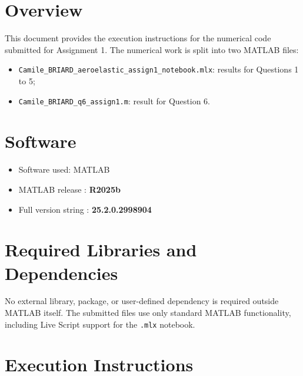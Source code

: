 \renewcommand{\parttitle}{Numerical Code}
\setlength{\parskip}{0pt}

\section*{Overview}
This document provides the execution instructions for the numerical code submitted for Assignment 1.
The numerical work is split into two MATLAB files:
\begin{itemize}\itemsep=0pt\parsep=0pt
\item \texttt{Camile\_BRIARD\_aeroelastic\_assign1\_notebook.mlx}: results for Questions 1 to 5;
\item \texttt{Camile\_BRIARD\_q6\_assign1.m}: result for Question 6.
\end{itemize}
\vspace{2em}
\noindent
\begin{minipage}[t]{0.30\textwidth}
\section*{Software}
\begin{itemize}\itemsep=0pt\parsep=0pt
\item Software used: MATLAB
\item MATLAB release : \textbf{R2025b}
\item Full version string : \textbf{25.2.0.2998904}
\end{itemize}
\end{minipage}%
\hfill%
\begin{minipage}[t]{0.63\textwidth}
\section*{Required Libraries and Dependencies}
No external library, package, or user-defined dependency is required outside MATLAB itself.
The submitted files use only standard MATLAB functionality, including Live Script support for the \texttt{.mlx} notebook.
\end{minipage}
\section*{Execution Instructions}

